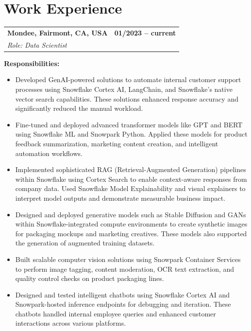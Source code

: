 
\vspace{-20pt}
\section*{Work Experience}
\vspace{-20pt}
\noindent
\begin{tabularx}{\linewidth}{@{}X r@{}}
  \textbf{Mondee, Fairmont, CA, USA} & \textbf{01/2023 -- current}\\
  \textit{Role: Data Scientist} &
\end{tabularx}

\textbf{Responsibilities:}
\begin{itemize}
  \item Developed GenAI-powered solutions to automate internal customer support processes using
        Snowflake Cortex AI, LangChain, and Snowflake's native vector search capabilities. These
        solutions enhanced response accuracy and significantly reduced the manual workload.

  \item Fine-tuned and deployed advanced transformer models like GPT and BERT using Snowflake ML
        and Snowpark Python. Applied these models for product feedback summarization, marketing
        content creation, and intelligent automation workflows.

  \item Implemented sophisticated RAG (Retrieval-Augmented Generation) pipelines within Snowflake
        using Cortex Search to enable context-aware responses from company data. Used Snowflake
        Model Explainability and visual explainers to interpret model outputs and demonstrate
        measurable business impact.

  \item Designed and deployed generative models such as Stable Diffusion and GANs within
        Snowflake-integrated compute environments to create synthetic images for packaging mockups
        and marketing creatives. These models also supported the generation of augmented training
        datasets.

  \item Built scalable computer vision solutions using Snowpark Container Services to perform image
        tagging, content moderation, OCR text extraction, and quality control checks on product
        packaging lines.

  \item Designed and tested intelligent chatbots using Snowflake Cortex AI and Snowpark-hosted
        inference endpoints for debugging and iteration. These chatbots handled internal employee
        queries and enhanced customer interactions across various platforms.


\end{itemize}
